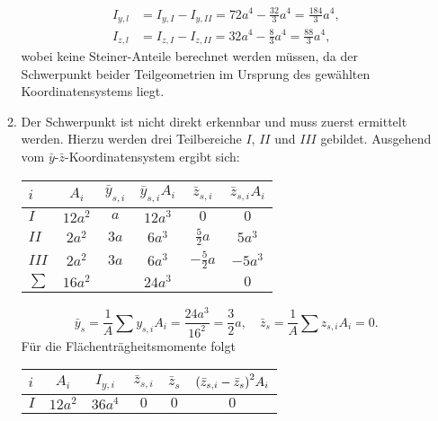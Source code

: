 \documentclass{exercise}
\begin{document}
\begin{enumerate}
\begin{enumerate}
            \begin{align*}
                I_{y, l} &= I_{y, I} - I_{y, II} = 72a^4 - \frac{32}{3}a^4 = \frac{184}{3}a^4,\\
                I_{z, l} &= I_{z, I} - I_{z, II} = 32a^4 - \frac{8}{3}a^4 = \frac{88}{3}a^4,
            \end{align*}
            wobei keine Steiner-Anteile berechnet werden müssen, da der Schwerpunkt beider Teilgeometrien im Ursprung des gewählten Koordinatensystems liegt.
            \item Der Schwerpunkt ist nicht direkt erkennbar und muss zuerst ermittelt werden.
            Hierzu werden drei Teilbereiche \(I\), \(II\) und \(III\) gebildet.
            Ausgehend vom \(\bar{y}\)-\(\bar{z}\)-Koordinatensystem ergibt sich:
            \begin{center}
                \begin{tabular}{lccccc}
                    \toprule
                    \(i\) & \(A_i\) & \(\bar{y}_{s, i}\) & \(\bar{y}_{s, i}A_i\) & \(\bar{z}_{s, i}\) & \(\bar{z}_{s, i}A_i\)\\
                    \midrule
                    \(I\) & \(12a^2\) & \(a\) & \(12a^3\) & \(0\) & \(0\)\\
                    \(II\) & \(2a^2\) & \(3a\) & \(6a^3\) & \(\frac{5}{2}a\) & \(5a^3\)\\
                    \(III\) & \(2a^2\) & \(3a\) & \(6a^3\) & \(-\frac{5}{2}a\) & \(-5a^3\)\\
                    \midrule
                    \(\sum\) & \(16a^2\) & & \(24a^3\) & & \(0\)\\
                    \bottomrule
                \end{tabular}
            \end{center}
            \[
                \bar{y}_s = \frac{1}{A}\sum y_{s, i}A_i = \frac{24a^3}{16^2} = \frac{3}{2}a, \quad \bar{z}_s = \frac{1}{A}\sum z_{s, i}A_i = 0.
            \]
            Für die Flächenträgheitsmomente folgt
            \begin{center}
                \begin{tabular}{lccccc}
                    \toprule
                    \(i\) & \(A_i\) & \(I_{y, i}\) & \(\bar{z}_{s, i}\) & \(\bar{z}_s\) & \(\parentheses*{\bar{z}_{s, i} - \bar{z}_s}^2 A_i\)\\
                    \midrule
                    \(I\) & \(12a^2\) & \(36a^4\) & \(0\) & \(0\) & \(0\)\\

\end{tabular}
\end{center}
\end{enumerate}
\end{enumerate}
\end{document}
